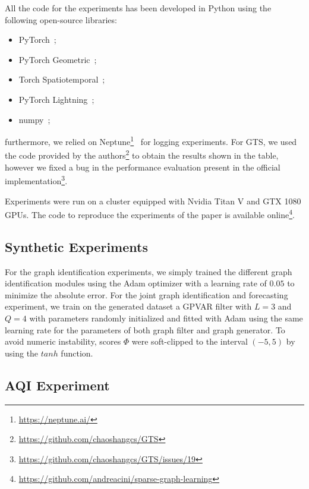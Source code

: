 All the code for the experiments has been developed in Python using the following open-source libraries:
\begin{itemize}
    \item PyTorch~\citep{paske2019pytorch};
    \item PyTorch Geometric~\citep{fey2019fast};
    \item Torch Spatiotemporal~\citep{Cini_Torch_Spatiotemporal_2022};
    \item PyTorch Lightning~\citep{Falcon_PyTorch_Lightning_2019};
    \item numpy~\citep{harris2020array};
\end{itemize}
furthermore, we relied on Neptune\footnote{\url{https://neptune.ai/}}~\citep{neptune2021neptune} for logging experiments. For GTS, we used the code provided by the authors\footnote{\url{https://github.com/chaoshangcs/GTS}} to obtain the results shown in the table, however we fixed a bug in the performance evaluation present in the official implementation\footnote{\url{https://github.com/chaoshangcs/GTS/issues/19}}.

Experiments were run on a cluster equipped with Nvidia Titan V and GTX 1080 GPUs. The code to reproduce the experiments of the paper is available online\footnote{\url{https://github.com/andreacini/sparse-graph-learning}}. 

\subsection{Synthetic Experiments}

For the graph identification experiments, we simply trained the different graph identification modules using the Adam optimizer with a learning rate of $0.05$ to minimize the absolute error. For the joint graph identification and forecasting experiment, we train on the generated dataset a GPVAR filter with $L=3$ and $Q=4$ with parameters randomly initialized and fitted with Adam using the same learning rate for the parameters of both graph filter and graph generator. To avoid numeric instability, scores $\Phi$ were soft-clipped to the interval $(-5, 5)$ by using the $tanh$ function.

\subsection{AQI Experiment} 


